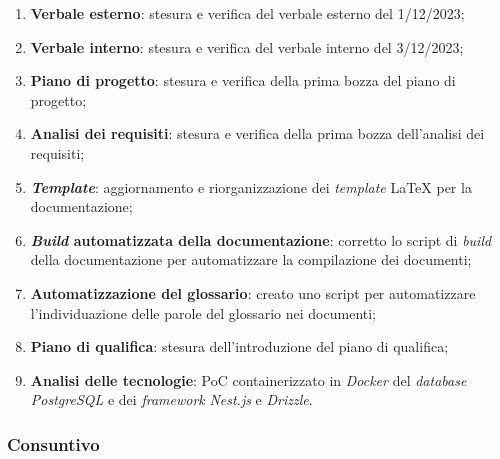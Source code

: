\begin{enumerate}
	\item \textbf{Verbale esterno}: stesura e verifica del verbale esterno del
	      1/12/2023;

	\item \textbf{Verbale interno}: stesura e verifica del verbale interno del
	      3/12/2023;

	\item \textbf{Piano di progetto}: stesura e verifica della prima bozza del
	      piano di progetto;

	\item \textbf{Analisi dei requisiti}: stesura e verifica della prima bozza
	      dell'analisi dei requisiti;

	\item \textbf{\textit{Template}}: aggiornamento e riorganizzazione dei
	      \textit{template} LaTeX per la documentazione;

	\item \textbf{\textit{Build} automatizzata della documentazione}:
	      corretto lo script di \textit{build} della documentazione per
	      automatizzare la compilazione dei documenti;

	\item \textbf{Automatizzazione del glossario}: creato uno script per
	      automatizzare l'individuazione delle parole del glossario nei
	      documenti;

	\item \textbf{Piano di qualifica}: stesura dell'introduzione del piano
	      di qualifica;

	\item \textbf{Analisi delle tecnologie}: PoC containerizzato in
	      \textit{Docker} del \textit{database} \textit{PostgreSQL} e dei
	      \textit{framework} \textit{Nest.js} e \textit{Drizzle}.
\end{enumerate}

\subsubsection{Consuntivo}

